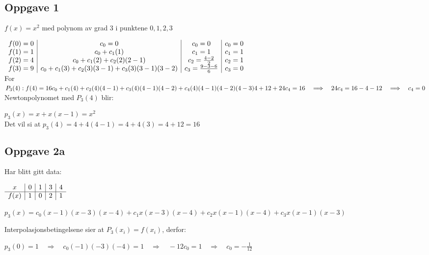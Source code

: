 \documentclass{article}
\newcommand{\req}{\quad\Longrightarrow\quad}
\begin{document}
\subsection*{Oppgave 1}
\(f(x)=x^2\) med polynom av grad 3 i punktene $0, 1, 2, 3$

\(
\begin{array}{c | c | c | c}
     f(0) = 0 & c_0 = 0          &    c_0 = 0 & c_0 = 0\\
     f(1) = 1 & c_0 + c_1(1)   & c_1 = 1 & c_1 = 1\\
     f(2) = 4 & c_0 + c_1(2) + c_2(2)(2-1) &  c_2 = \frac{4 - 2}{2} & c_2 = 1\\
     f(3) = 9 & c_0 + c_1(3) + c_2(3)(3-1) + c_3(3)(3-1)(3-2) 
     & c_3 = \frac{9 - 3  - 6}{6} &  c_3 = 0
\end{array}
\)\\

For 
\(P_3(4):\\\\
 f(4) = 16 
 \\\\
 c_0 + c_1(4) + c_2(4)(4-1) + c_3(4)(4-1)(4-2) + c_4(4)(4-1)(4-2)(4-3)
 \\\\
 4+12+24c_4 = 16 \req 24c_4 = 16-4-12 \req c_4 = 0
\)\\


Newtonpolynomet med $P_3(4)$ blir:

\(p_3(x) = x + x(x-1)  = x^2\)\\

Det vil si at 
\(p_3(4) = 4 + 4(4-1) = 4 + 4(3) = 4 + 12 = 16\)

\newpage
\subsection*{Oppgave 2a}
Har blitt gitt data:

\(
\begin{array}{c | c | c | c | c}
    x & 0 & 1 & 3 & 4 \\ 
    \hline 
    f(x) & 1 & 0 & 2 & 1 \\ 
\end{array}
\)

\(p_3(x)=c_0(x-1)(x-3)(x-4)+c_1x(x-3)(x-4)+c_2x(x-1)(x-4)+c_3x(x-1)(x-3)
\)

Interpolasjonsbetingelsene sier at $P_3(x_i) = f(x_i)$, derfor:

\(p_3(0)=1 \req c_0(-1)(-3)(-4) = 1 \req -12c_0 = 1 \req c_0 = -\frac{1}{12}
\)
\end{document}
